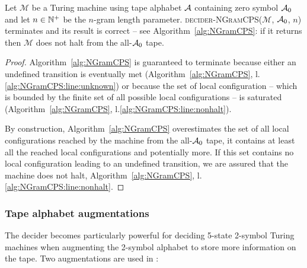 \begin{theorem}
    Let $\mathcal{M}$ be a Turing machine using tape alphabet $\mathcal{A}$ containing zero symbol $\mathcal{A}_0$ and let $n \in \mathbb{N}^+$ be the $n$-gram length parameter. \textsc{decider-NGramCPS}($\mathcal{M}$, $\mathcal{A}_0$, $n$) terminates and its result is correct -- see Algorithm~\ref{alg:NGramCPS}: if it returns \NONHALT then $\mathcal{M}$ does not halt from the all-$\mathcal{A}_0$ tape.
\end{theorem}
\begin{proof}
    Algorithm~\ref{alg:NGramCPS} is guaranteed to terminate because either an undefined transition is eventually met (Algorithm~\ref{alg:NGramCPS}, l.\ref{alg:NGramCPS:line:unknown}) or because the set of local configuration -- which is bounded by the finite set of all possible local configurations -- is saturated (Algorithm~\ref{alg:NGramCPS}, l.\ref{alg:NGramCPS:line:nonhalt}).

    By construction, Algorithm~\ref{alg:NGramCPS} overestimates the set of all local configurations reached by the machine from the all-$\mathcal{A}_0$ tape, \ie it contains at least all the reached local configurations and potentially more. If this set contains no local configuration leading to an undefined transition, we are assured that the machine does not halt, Algorithm~\ref{alg:NGramCPS}, l.\ref{alg:NGramCPS:line:nonhalt}.
\end{proof}



\subsubsection{Tape alphabet augmentations}\label{sec:n-gramCPS:augmentations}

The \ngramcps decider becomes particularly powerful for deciding 5-state 2-symbol Turing machines when augmenting the 2-symbol alphabet to store more information on the tape. Two augmentations are used in \CoqBB:

